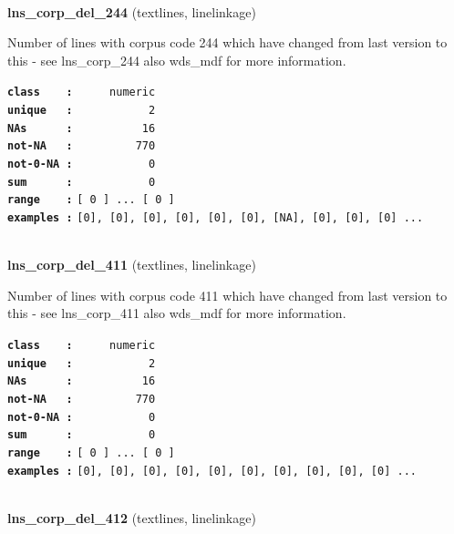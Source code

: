 \documentclass[]{article}
\begin{document}
~

\textbf{lns\_corp\_del\_244} (textlines, linelinkage)

Number of lines with corpus code 244 which have changed from last
version to this - see lns\_corp\_244 also wds\_mdf for more information.

\textbf{\texttt{class\ \ \ \ :}} \texttt{~~~~~numeric}\\
\textbf{\texttt{unique\ \ \ :}} \texttt{~~~~~~~~~~~2}\\
\textbf{\texttt{NAs\ \ \ \ \ \ :}} \texttt{~~~~~~~~~~16}\\
\textbf{\texttt{not-NA\ \ \ :}} \texttt{~~~~~~~~~770}\\
\textbf{\texttt{not-0-NA\ :}} \texttt{~~~~~~~~~~~0}\\
\textbf{\texttt{sum\ \ \ \ \ \ :}} \texttt{~~~~~~~~~~~0}\\
\textbf{\texttt{range\ \ \ \ :}}
\texttt{{[}\ 0\ {]}\ ...\ {[}\ 0\ {]}}\\
\textbf{\texttt{examples\ :}}
\texttt{{[}0{]},\ {[}0{]},\ {[}0{]},\ {[}0{]},\ {[}0{]},\ {[}0{]},\ {[}NA{]},\ {[}0{]},\ {[}0{]},\ {[}0{]}\ ...}\\

~

\textbf{lns\_corp\_del\_411} (textlines, linelinkage)

Number of lines with corpus code 411 which have changed from last
version to this - see lns\_corp\_411 also wds\_mdf for more information.

\textbf{\texttt{class\ \ \ \ :}} \texttt{~~~~~numeric}\\
\textbf{\texttt{unique\ \ \ :}} \texttt{~~~~~~~~~~~2}\\
\textbf{\texttt{NAs\ \ \ \ \ \ :}} \texttt{~~~~~~~~~~16}\\
\textbf{\texttt{not-NA\ \ \ :}} \texttt{~~~~~~~~~770}\\
\textbf{\texttt{not-0-NA\ :}} \texttt{~~~~~~~~~~~0}\\
\textbf{\texttt{sum\ \ \ \ \ \ :}} \texttt{~~~~~~~~~~~0}\\
\textbf{\texttt{range\ \ \ \ :}}
\texttt{{[}\ 0\ {]}\ ...\ {[}\ 0\ {]}}\\
\textbf{\texttt{examples\ :}}
\texttt{{[}0{]},\ {[}0{]},\ {[}0{]},\ {[}0{]},\ {[}0{]},\ {[}0{]},\ {[}0{]},\ {[}0{]},\ {[}0{]},\ {[}0{]}\ ...}\\

~

\textbf{lns\_corp\_del\_412} (textlines, linelinkage)
\end{document}
